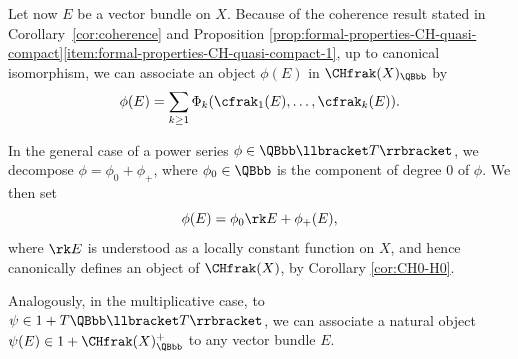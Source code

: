 Let now $E$ be a vector bundle on $X$. Because of the coherence result stated in Corollary~\ref{cor:coherence} and Proposition \ref{prop:formal-properties-CH-quasi-compact}\eqref{item:formal-properties-CH-quasi-compact-1}, up to canonical isomorphism, we can associate an object $\phi(E)$ in $\CHfrak(X)_{\QBbb}$ by
\begin{displaymath}
\phi(E)=\sum_{k\geq 1}\Phi_{k}(\cfrak_{1}(E),\ldots, \cfrak_{k}(E)).
\end{displaymath}

In the general case of a power series $\phi\in\QBbb\llbracket T\rrbracket$, we decompose $\phi=\phi_{0}+\phi_{+}$, where $\phi_{0}\in\QBbb$ is the component of degree 0 of $\phi$. We then set
\begin{displaymath}
\phi(E)=\phi_{0}\rk E +\phi_{+}(E),
\end{displaymath}
where $\rk E$ is understood as a locally constant function on $X$, and hence canonically defines an object of $\CHfrak(X)$, by Corollary \ref{cor:CH0-H0}.

Analogously, in the multiplicative case, to $\psi\in 1+T\QBbb\llbracket T\rrbracket$, we can associate a natural object $\psi(E) \in 1+\CHfrak(X)_{\QBbb}^{+}$ to any vector bundle $E$.

